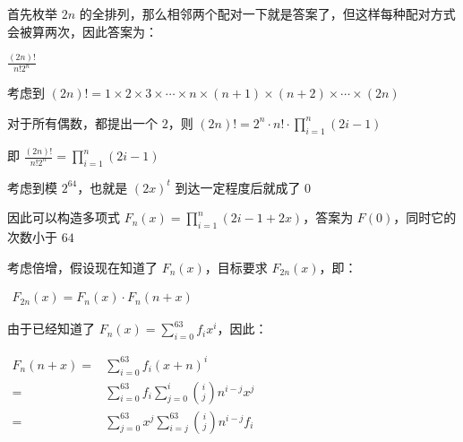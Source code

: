 
首先枚举 $2n$ 的全排列，那么相邻两个配对一下就是答案了，但这样每种配对方式会被算两次，因此答案为：

 $\frac{(2n)!}{n!2^{n}} $

考虑到 $(2n)!=1 \times 2 \times 3 \times \cdots \times n \times (n+1) \times (n+2) \times \cdots \times (2n)$

对于所有偶数，都提出一个 $2$，则 $(2n)!=2^n \cdot n! \cdot \prod_{i=1}^{n}(2i-1)$

即 $\frac{(2n)!}{n!2^{n}}=\prod_{i=1}^{n}(2i-1)$

考虑到模 $2^{64}$，也就是 $(2x)^t$ 到达一定程度后就成了 $0$

因此可以构造多项式 $F_n(x)=\prod_{i=1}^{n}(2i-1+2x)$，答案为 $F(0)$，同时它的次数小于 $64$

考虑倍增，假设现在知道了 $F_n(x)$，目标要求 $F_{2n}(x)$，即：

$ \begin{aligned} F_{2n}(x)=F_n(x) \cdot F_{n}(n+x) \end{aligned} $

由于已经知道了 $F_n(x)=\sum_{i=0}^{63}f_ix^i$，因此：

$ \begin{aligned} F_{n}(n+x) =&\sum_{i=0}^{63}f_i (x+n)^i \\ =&\sum_{i=0}^{63} f_i \sum_{j=0}^{i} {i \choose j} n^{i-j}x^j \\ =&\sum_{j=0}^{63}x^j \sum_{i=j}^{63} {i \choose j} n^{i-j} f_i \end{aligned} $